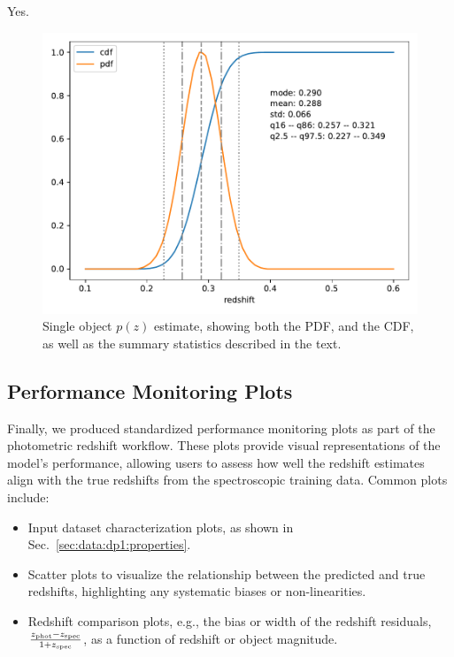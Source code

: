 Yes.\begin{figure}
    \centering
    \includegraphics[width=1.0\linewidth]{figures/pdf.pdf}
    \caption{Single object $p(z)$ estimate, showing both the PDF, and the CDF, as well as the summary statistics described in the text.}
    \label{fig:pdf}
\end{figure}


\subsection{Performance Monitoring Plots}
\label{sec:products:peformance_plots}

Finally, we produced standardized performance monitoring plots as part of the photometric redshift workflow.  These plots provide visual representations of the model's performance, allowing users to assess how well the redshift estimates align with the true redshifts from the spectroscopic training data.  Common plots include:

\begin{itemize}
\item{Input dataset characterization plots, as shown in Sec.~\ref{sec:data:dp1:properties}.}
\item{Scatter plots to visualize the relationship between the predicted and true redshifts, highlighting any systematic biases or non-linearities.}
\item{Redshift comparison plots, e.g., the bias or width of the redshift residuals, $\frac{z_{\rm phot} - z_{\rm spec}}{1 + z_{\rm spec}}$, as a function of redshift or object magnitude.}
\end{itemize}

